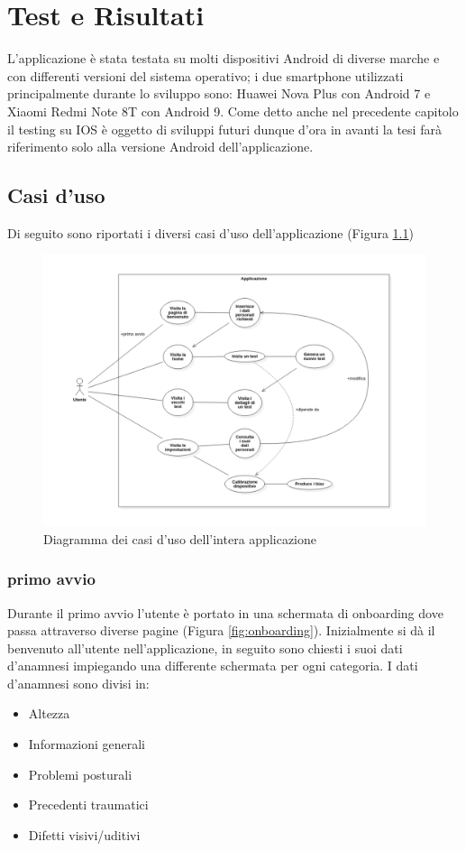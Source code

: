 \chapter{Test e Risultati}
\label{cap:test_e_risultati}

L'applicazione è stata testata su molti dispositivi Android di diverse marche e con differenti versioni del sistema operativo; i due smartphone utilizzati principalmente durante lo sviluppo sono: Huawei Nova Plus con Android 7 e Xiaomi Redmi Note 8T con Android 9. Come detto anche nel precedente capitolo il testing su IOS è oggetto di sviluppi futuri dunque d'ora in avanti la tesi farà riferimento solo alla versione Android dell'applicazione.

\section{Casi d'uso}

Di seguito sono riportati i diversi casi d'uso dell'applicazione (Figura \ref{fig:use_case})

\begin{figure}[!htb]
    \centering
    \includegraphics[width=\textwidth]{figures/use_case_diagram.png}
    \caption{Diagramma dei casi d'uso dell'intera applicazione}
    \label{fig:use_case}
\end{figure}

\subsection{primo avvio}
Durante il primo avvio l'utente è portato in una schermata di onboarding dove passa attraverso diverse pagine (Figura \ref{fig:onboarding}). Inizialmente si dà il benvenuto all'utente nell'applicazione, in seguito sono chiesti i suoi dati d'anamnesi impiegando una differente schermata per ogni categoria. I dati d'anamnesi sono divisi in:
\begin{itemize}
    \item Altezza
    \item Informazioni generali
    \item Problemi posturali
    \item Precedenti traumatici
    \item Difetti visivi/uditivi
\end{itemize}

